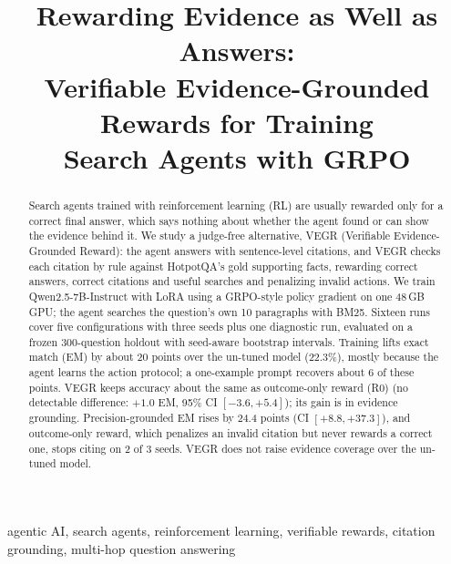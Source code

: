 \documentclass[conference]{IEEEtran}
\begin{document}
\title{Rewarding Evidence as Well as Answers:\\
Verifiable Evidence-Grounded Rewards for Training\\ Search Agents with GRPO}

\ifdefined\anonymous
\author{
}
\else
\author{
}
\fi

\maketitle

\begin{abstract}
Search agents trained with reinforcement learning (RL) are usually rewarded only for a correct final answer, which says nothing about whether the agent found or can show the evidence behind it. We study a judge-free alternative, VEGR (Verifiable Evidence-Grounded Reward): the agent answers with sentence-level citations, and VEGR checks each citation by rule against HotpotQA's gold supporting facts, rewarding correct answers, correct citations and useful searches and penalizing invalid actions. We train Qwen2.5-7B-Instruct with LoRA using a GRPO-style policy gradient on one 48\,GB GPU; the agent searches the question's own 10 paragraphs with BM25. Sixteen runs cover five configurations with three seeds plus one diagnostic run, evaluated on a frozen 300-question holdout with seed-aware bootstrap intervals. Training lifts exact match (EM) by about 20 points over the un-tuned model (22.3\%), mostly because the agent learns the action protocol; a one-example prompt recovers about 6 of these points. VEGR keeps accuracy about the same as outcome-only reward (R0) (no detectable difference: $+1.0$ EM, 95\% CI $[-3.6, +5.4]$); its gain is in evidence grounding. Precision-grounded EM rises by 24.4 points (CI $[+8.8, +37.3]$), and outcome-only reward, which penalizes an invalid citation but never rewards a correct one, stops citing on 2 of 3 seeds. VEGR does not raise evidence coverage over the un-tuned model.
\end{abstract}

\begin{IEEEkeywords}
agentic AI, search agents, reinforcement learning, verifiable rewards, citation grounding, multi-hop question answering
\end{IEEEkeywords}
\end{document}
